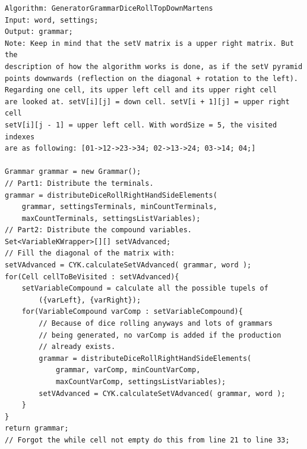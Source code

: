 \lstset{language=java}
\begin{lstlisting}[frame=htrbl,caption={GeneratorGrammarDiceRollTopDownMartens}, 
label={lst:GeneratorGrammarDiceRollTopDownMartens}]
Algorithm: GeneratorGrammarDiceRollTopDownMartens
Input: word, settings;
Output: grammar;
Note: Keep in mind that the setV matrix is a upper right matrix. But the
description of how the algorithm works is done, as if the setV pyramid 
points downwards (reflection on the diagonal + rotation to the left).
Regarding one cell, its upper left cell and its upper right cell 
are looked at. setV[i][j] = down cell. setV[i + 1][j] = upper right cell
setV[i][j - 1] = upper left cell. With wordSize = 5, the visited indexes 
are as following: [01->12->23->34; 02->13->24; 03->14; 04;]

Grammar grammar = new Grammar();
// Part1: Distribute the terminals.
grammar = distributeDiceRollRightHandSideElements(
	grammar, settingsTerminals, minCountTerminals, 
	maxCountTerminals, settingsListVariables);
// Part2: Distribute the compound variables.
Set<VariableKWrapper>[][] setVAdvanced;
// Fill the diagonal of the matrix with:
setVAdvanced = CYK.calculateSetVAdvanced( grammar, word );
for(Cell cellToBeVisited : setVAdvanced){
	setVariableCompound = calculate all the possible tupels of 
		({varLeft}, {varRight});
	for(VariableCompound varComp : setVariableCompound){
		// Because of dice rolling anyways and lots of grammars 
		// being generated, no varComp is added if the production
		// already exists.
		grammar = distributeDiceRollRightHandSideElements(
			grammar, varComp, minCountVarComp, 
			maxCountVarComp, settingsListVariables);
		setVAdvanced = CYK.calculateSetVAdvanced( grammar, word );
	}
}
return grammar;
// Forgot the while cell not empty do this from line 21 to line 33;
\end{lstlisting}


